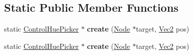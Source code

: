 \subsection*{Static Public Member Functions}
\begin{DoxyCompactItemize}
\item 
\mbox{\label{classControlHuePicker_ab5175f8c7f545901c65c6de511d578a6}} 
static \hyperlink{classControlHuePicker}{Control\+Hue\+Picker} $\ast$ {\bfseries create} (\hyperlink{classNode}{Node} $\ast$target, \hyperlink{classVec2}{Vec2} pos)
\item 
\mbox{\label{classControlHuePicker_ab5eed1801dd561788cf4ad1a0d721115}} 
static \hyperlink{classControlHuePicker}{Control\+Hue\+Picker} $\ast$ {\bfseries create} (\hyperlink{classNode}{Node} $\ast$target, \hyperlink{classVec2}{Vec2} pos)
\end{DoxyCompactItemize}
